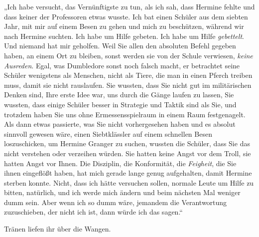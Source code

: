 „Ich habe versucht, das Vernünftigste zu tun, als ich sah, dass Hermine fehlte und dass keiner der Professoren etwas wusste. Ich bat einen Schüler aus dem siebten Jahr, mit mir auf einem Besen zu gehen und mich zu beschützen, während wir nach Hermine suchten. Ich habe um Hilfe gebeten. Ich habe um Hilfe \emph{gebettelt}. Und niemand hat mir geholfen. Weil Sie allen den absoluten Befehl gegeben haben, an einem Ort zu bleiben, sonst werden sie von der Schule verwiesen, \emph{keine Ausreden}. Egal, was Dumbledore sonst noch falsch macht, er betrachtet seine Schüler wenigstens als Menschen, nicht als Tiere, die man in einen Pferch treiben muss, damit sie nicht rauslaufen. Sie wussten, dass Sie nicht gut im militärischen Denken sind, Ihre erste Idee war, uns durch die Gänge laufen zu lassen, Sie wussten, dass einige Schüler besser in Strategie und Taktik sind als Sie, und trotzdem haben Sie uns ohne Ermessensspielraum in einem Raum festgenagelt. Als dann etwas passierte, was Sie nicht vorhergesehen haben und es absolut sinnvoll gewesen wäre, einen Siebtklässler auf einem schnellen Besen loszuschicken, um Hermine Granger zu suchen, wussten die Schüler, dass Sie das nicht verstehen oder verzeihen würden. Sie hatten keine Angst vor dem Troll, sie hatten Angst vor Ihnen. Die Disziplin, die Konformität, die \emph{Feigheit}, die Sie ihnen eingeflößt haben, hat mich gerade lange genug aufgehalten, damit Hermine sterben konnte. Nicht, dass ich hätte versuchen sollen, normale Leute um Hilfe zu bitten, natürlich, und ich werde mich ändern und beim nächsten Mal weniger dumm sein. Aber wenn ich so dumm wäre, jemandem die Verantwortung zuzuschieben, der nicht ich ist, dann würde ich das sagen.“

Tränen liefen ihr über die Wangen.

